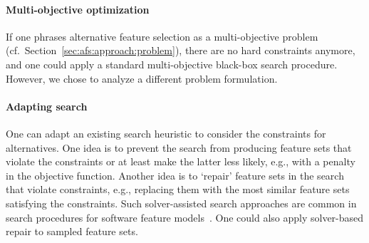 \documentclass{article}
\theoremstyle{definition}
\begin{document}
\paragraph{Multi-objective optimization}

If one phrases alternative feature selection as a multi-objective problem (cf.~Section~\ref{sec:afs:approach:problem}), there are no hard constraints anymore, and one could apply a standard multi-objective black-box search procedure.
However, we chose to analyze a different problem formulation.

\paragraph{Adapting search}

One can adapt an existing search heuristic to consider the constraints for alternatives.
One idea is to prevent the search from producing feature sets that violate the constraints or at least make the latter less likely, e.g., with a penalty in the objective function.
Another idea is to `repair' feature sets in the search that violate constraints, e.g., replacing them with the most similar feature sets satisfying the constraints.
Such solver-assisted search approaches are common in search procedures for software feature models~\cite{guo2018preserve, henard2015combining, white2010automated}.
One could also apply solver-based repair to sampled feature sets.
\end{document}
